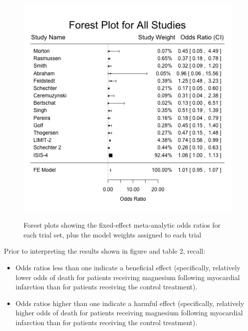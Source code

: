 \documentclass[fleqn,10pt]{SelfArx} %
\begin{document}
\begin{center}
\begin{figure}
\\
\includegraphics[scale=0.45]{./../figures/forest_late.png}
\label{fig:forests}
\caption{Forest plots showing the fixed-effect meta-analytic odds ratios for each trial set, plus the model weights assigned to each trial}
\end{figure}
\end{center}
Prior to interpreting the results shown in figure and table 2, recall:
\begin{itemize}
\item Odds ratios less than one indicate a beneficial effect (specifically, relatively lower odds of death for patients receiving magnesium following myocardial infarction than for patients receiving the control treatment).
\item Odds ratios higher than one indicate a harmful effect (specifically, relatively higher odds of death for patients receiving magnesium following myocardial infarction than for patients receiving the control treatment).
\end{itemize}
\end{document}
